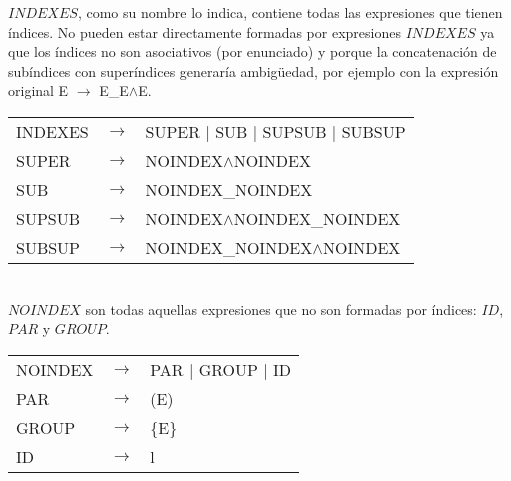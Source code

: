 $INDEXES$, como su nombre lo indica, contiene todas las expresiones que tienen \'indices. No pueden estar directamente formadas por expresiones $INDEXES$ ya que los \'indices no son asociativos (por enunciado) y porque la concatenaci\'on
de sub\'indices con super\'indices generar\'ia ambig\"uedad, por ejemplo con la expresi\'on original E $\rightarrow$ E\_E$\wedge$E. \\


\begin{tabular}{ l c l }
    INDEXES &  $\rightarrow$ & SUPER $|$ SUB $|$ SUPSUB $|$ SUBSUP \\
    SUPER &    $\rightarrow$ & NOINDEX$\wedge$NOINDEX \\
    SUB &      $\rightarrow$ & NOINDEX\_NOINDEX \\
    SUPSUB &   $\rightarrow$ & NOINDEX$\wedge$NOINDEX\_NOINDEX \\
    SUBSUP &   $\rightarrow$ & NOINDEX\_NOINDEX$\wedge$NOINDEX \\
\end{tabular}\\

$NOINDEX$ son todas aquellas expresiones que no son formadas por \'indices: $ID$, $PAR$ y $GROUP$. \\


\begin{tabular}{ l c l }
    NOINDEX &  $\rightarrow$ & PAR $|$ GROUP $|$ ID \\    
    PAR &      $\rightarrow$ & (E) \\
    GROUP &    $\rightarrow$ & \{E\} \\
    ID &       $\rightarrow$ & l \\
\end{tabular} \\
